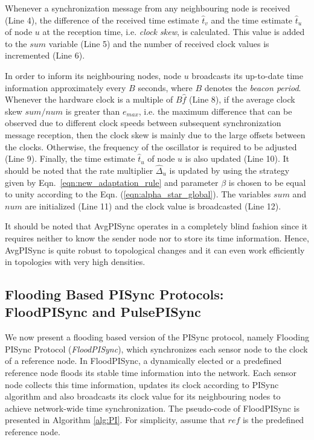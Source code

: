 \documentclass[english,a4paper,10pt,final]{article}
\numberwithin{equation}{section}
\numberwithin{figure}{section}
\begin{document}
Whenever a synchronization message from any neighbouring node is received (Line 4), the difference of the received time estimate $\hat{t}_{v}$ and the time estimate $\hat{t}_{u}$ of node $u$ at the reception time, i.e. \textit{clock skew},  is calculated. This value is added to the $sum$ variable (Line 5) and the number of received clock values is incremented (Line 6).

In order to inform its neighbouring nodes, node $u$ broadcasts its up-to-date time information approximately every $B$ seconds, where $B$ denotes the \textit{beacon period}. Whenever the hardware clock is a multiple of $B\hat{f}$ (Line 8), if the average clock skew $sum/num$ is greater than $e_{max}$, i.e. the maximum difference that can be observed due to different clock speeds between subsequent synchronization message reception, then the clock skew is mainly due to the large offsets between the clocks. Otherwise, the frequency of the oscillator is required to be adjusted (Line 9). Finally, the time estimate $\hat{t}_{u}$ of node $u$ is also updated (Line 10). It should be noted that the rate multiplier $\hat\Delta_u$ is updated by using the strategy given by  Eqn.~\eqref{eqn:new_adaptation_rule} and parameter $\beta$ is chosen to be equal to unity according to the Eqn. (\ref{eqn:alpha_star_global}). The variables $sum$ and $num$ are initialized (Line 11)  and the clock value is broadcasted (Line 12).

It should be noted that AvgPISync operates in a completely blind fashion since it requires neither to know the sender node nor to store its time information. Hence, AvgPISync is quite robust to topological changes and it can even work efficiently in topologies with very high densities.

\subsection{Flooding Based PISync Protocols: FloodPISync and PulsePISync}

We now present a flooding based version of the PISync protocol, namely Flooding PISync Protocol (\textit{FloodPISync}),  which synchronizes each sensor node to the clock of a reference node. In FloodPISync, a dynamically elected or a predefined reference node floods its stable time information into the network. Each sensor node collects this time information, updates its clock according to PISync algorithm and also broadcasts its clock value for its neighbouring nodes to achieve network-wide time synchronization. The pseudo-code of FloodPISync is presented in Algorithm \ref{alg:PI}. For simplicity, assume that $ref$ is the predefined reference node. 
\end{document}
